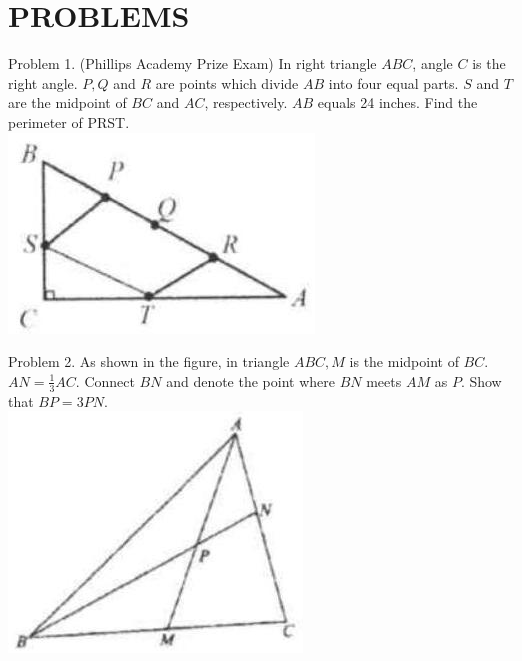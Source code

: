 \documentclass[10pt]{article}
\begin{document}
\section*{PROBLEMS}
Problem 1. (Phillips Academy Prize Exam) In right triangle \(A B C\), angle \(C\) is the right angle. \(P, Q\) and \(R\) are points which divide \(A B\) into four equal parts. \(S\) and \(T\) are the midpoint of \(B C\) and \(A C\), respectively. \(A B\) equals 24 inches. Find the perimeter of PRST.\\
\includegraphics[max width=\textwidth, center]{2025_04_17_97bc1f7e44d93c271a88g-044(3)}

Problem 2. As shown in the figure, in triangle \(A B C, M\) is the midpoint of \(B C\). \(A N=\frac{1}{3} A C\). Connect \(B N\) and denote the point where \(B N\) meets \(A M\) as \(P\). Show that \(B P=3 P N\).\\
\includegraphics[max width=\textwidth, center]{2025_04_17_97bc1f7e44d93c271a88g-044}
\end{document}

